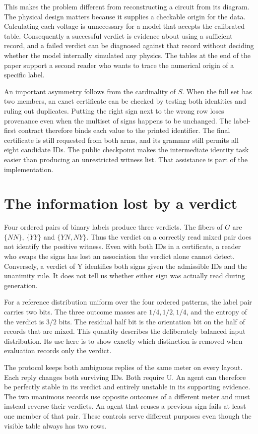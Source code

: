 \documentclass[12pt,letterpaper]{article}
\begin{document}
This makes the problem different from reconstructing a circuit from its diagram. The physical design matters because it supplies a checkable origin for the data. Calculating each voltage is unnecessary for a model that accepts the calibrated table. Consequently a successful verdict is evidence about using a sufficient record, and a failed verdict can be diagnosed against that record without deciding whether the model internally simulated any physics. The tables at the end of the paper support a second reader who wants to trace the numerical origin of a specific label.

An important asymmetry follows from the cardinality of $S$. When the full set has two members, an exact certificate can be checked by testing both identities and ruling out duplicates. Putting the right sign next to the wrong row loses provenance even when the multiset of signs happens to be unchanged. The label-first contract therefore binds each value to the printed identifier. The final certificate is still requested from both arms, and its grammar still permits all eight candidate IDs. The public checkpoint makes the intermediate identity task easier than producing an unrestricted witness list. That assistance is part of the implementation.

\section{The information lost by a verdict}
Four ordered pairs of binary labels produce three verdicts. The fibers of $G$ are $\{NN\}$, $\{YY\}$ and $\{YN,NY\}$. Thus the verdict on a correctly read mixed pair does not identify the positive witness. Even with both IDs in a certificate, a reader who swaps the signs has lost an association the verdict alone cannot detect. Conversely, a verdict of Y identifies both signs given the admissible IDs and the unanimity rule. It does not tell us whether either sign was actually read during generation.

For a reference distribution uniform over the four ordered patterns, the label pair carries two bits. The three outcome masses are $1/4,1/2,1/4$, and the entropy of the verdict is $3/2$ bits. The residual half bit is the orientation bit on the half of records that are mixed. This quantity describes the deliberately balanced input distribution. Its use here is to show exactly which distinction is removed when evaluation records only the verdict.

The protocol keeps both ambiguous replies of the same meter on every layout. Each reply changes both surviving IDs. Both require U. An agent can therefore be perfectly stable in its verdict and entirely unstable in its supporting evidence. The two unanimous records use opposite outcomes of a different meter and must instead reverse their verdicts. An agent that reuses a previous sign fails at least one member of that pair. These controls serve different purposes even though the visible table always has two rows.
\end{document}
